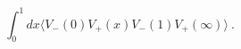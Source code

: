 \begin{equation}
\int_0^1 dx \langle V_- (0) V_+ (x) V_- (1) V_+ (\infty) \rangle
\ .
\end{equation}

